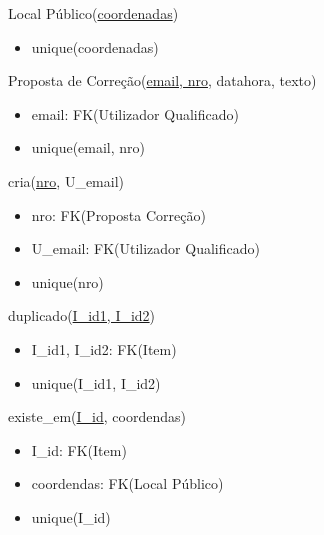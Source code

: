 \documentclass[12pt]{report}
\begin{document}
\begin{multicols}{2}
\vspace{5mm}


Local Público(\underline{coordenadas})
    \begin{itemize}
    \item unique(coordenadas)
    \end{itemize}


\vspace{5mm}


Proposta de Correção(\underline{email, nro}, datahora, texto)
    \begin{itemize}
    \item email: FK(Utilizador Qualificado)
    \item unique(email, nro)
    \end{itemize}



\vspace{5mm}


cria(\underline{nro}, U\_email)
    \begin{itemize}
    \item nro: FK(Proposta Correção)
    \item U\_email: FK(Utilizador Qualificado)
    \item unique(nro)                           %
    \end{itemize}   


\vspace{5mm}



duplicado(\underline{I\_id1, I\_id2})
    \begin{itemize}
    \item I\_id1, I\_id2: FK(Item)
    \item unique(I\_id1, I\_id2)                      %
    \end{itemize}


\vspace{5mm}


existe\_em(\underline{I\_id}, coordendas)
    \begin{itemize}
    \item I\_id: FK(Item)
    \item coordendas: FK(Local Público)
    \item unique(I\_id)                                             
    \end{itemize}


\vspace{5mm}



\end{multicols}
\end{document}
